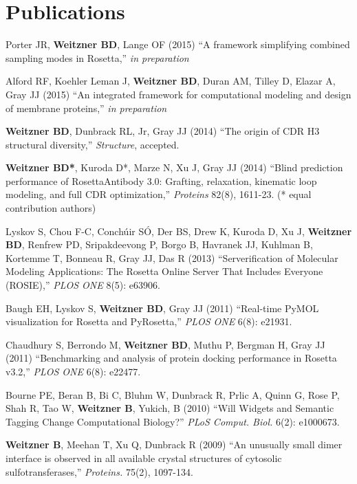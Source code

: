 \documentclass[12pt]{article}
\newcommand{\allcapsspacing}[1]{{\addfontfeature{LetterSpace=7.5}#1}}
\begin{document}
\section*{\allcapsspacing{Publications}}
\begin{etaremune}
\item Porter JR, \textbf{Weitzner BD}, Lange OF (2015) ``A framework simplifying combined sampling modes in Rosetta,'' \textit{in preparation}
\item Alford RF, Koehler Leman J, \textbf{Weitzner BD}, Duran AM, Tilley D, Elazar A, Gray JJ (2015) ``An integrated framework for computational modeling and design of membrane proteins,'' \textit{in preparation}
\item \textbf{Weitzner BD}, Dunbrack RL, Jr, Gray JJ (2014) ``The origin of CDR H3 structural diversity,'' \textit{Structure}, accepted.
\item \textbf{Weitzner BD*}, Kuroda D*, Marze N, Xu J, Gray JJ (2014) ``Blind prediction performance of RosettaAntibody 3.0: Grafting, relaxation, kinematic loop modeling, and full CDR optimization,'' \textit{Proteins} 82(8), 1611-23. (* equal contribution authors)
\item Lyskov S, Chou F-C, Conch{\'u}ir S{\'O}, Der BS, Drew K, Kuroda D, Xu J, \textbf{Weitzner BD}, Renfrew PD, Sripakdeevong P, Borgo B, Havranek JJ, Kuhlman B, Kortemme T, Bonneau R, Gray JJ, Das R (2013) ``Serverification of Molecular Modeling Applications: The Rosetta Online Server That Includes Everyone (ROSIE),'' \textit{PLOS ONE} 8(5): e63906.
\item Baugh EH, Lyskov S, \textbf{Weitzner BD}, Gray JJ (2011) ``Real-time PyMOL visualization for Rosetta and PyRosetta,'' \textit{PLOS ONE} 6(8): e21931.
\item Chaudhury S, Berrondo M, \textbf{Weitzner BD}, Muthu P, Bergman H, Gray JJ (2011) ``Benchmarking and analysis of protein docking performance in Rosetta v3.2,'' \textit{PLOS ONE} 6(8): e22477.
\item Bourne PE, Beran B, Bi C, Bluhm W, Dunbrack R, Prlic A, Quinn G, Rose P, Shah R, Tao W, \textbf{Weitzner B}, Yukich, B (2010) ``Will Widgets and Semantic Tagging Change Computational Biology?'' \textit{PLoS Comput. Biol.} 6(2): e1000673.
\item \textbf{Weitzner B}, Meehan T, Xu Q, Dunbrack R (2009) ``An unusually small dimer interface is observed in all available crystal structures of cytosolic sulfotransferases,'' \textit{Proteins.} 75(2), 1097-134.
\end{etaremune}
\end{document}
